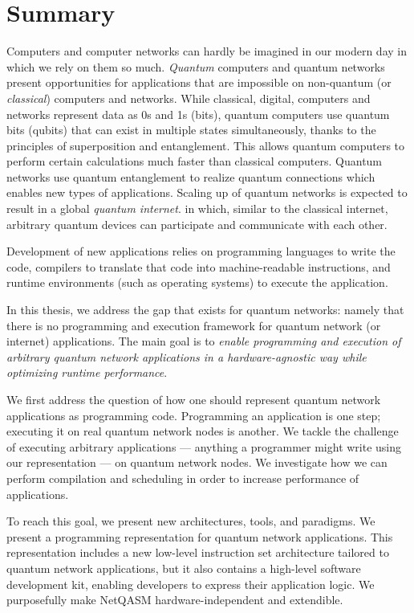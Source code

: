 \chapter*{Summary}

Computers and computer networks can hardly be imagined in our modern day in which we rely on them so much.
\emph{Quantum} computers and quantum networks present opportunities for applications that are impossible on non-quantum (or \emph{classical}) computers and networks.
While classical, digital, computers and networks represent data as 0s and 1s (bits), quantum computers use quantum bits (qubits) that can exist in multiple states simultaneously, thanks to the principles of superposition and entanglement.
This allows quantum computers to perform certain calculations much faster than classical computers.
Quantum networks use quantum entanglement to realize quantum connections which enables new types of applications.
Scaling up of quantum networks is expected to result in a global \textit{quantum internet}.
in which, similar to the classical internet, arbitrary quantum devices can participate and communicate with each other.

Development of new applications relies on programming languages to write the code, compilers to translate that code into machine-readable instructions, and runtime environments (such as operating systems) to execute the application.

In this thesis, we address the gap that exists for quantum networks: namely that there is no programming and execution framework for quantum network (or internet) applications.
The main goal is to \emph{enable programming and execution of arbitrary quantum network applications in a hardware-agnostic way while optimizing runtime performance}.

We first address the question of how one should represent quantum network applications as programming code.
Programming an application is one step; executing it on real quantum network nodes is another.
We tackle the challenge of executing arbitrary applications --- anything a programmer might write using our representation  --- on quantum network nodes.
We investigate how we can perform compilation and scheduling in order to increase performance of applications.

To reach this goal, we present new architectures, tools, and paradigms.
We present a programming representation for quantum network applications.
This representation includes a new low-level instruction set architecture tailored to quantum network applications,
but it also contains a high-level software development kit, enabling developers to express their application logic.
We purposefully make NetQASM hardware-independent and extendible.

